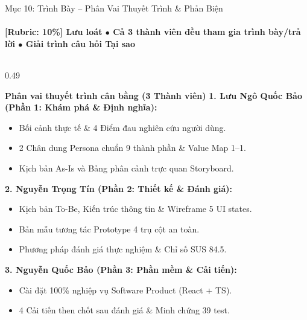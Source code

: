 \begin{frame}{Mục 10: Trình Bày -- Phân Vai Thuyết Trình \& Phản Biện}
  \framesubtitle{\color{PetcareSecondary}\textbf{[Rubric: 10\%] Lưu loát $\bullet$ Cả 3 thành viên đều tham gia trình bày/trả lời $\bullet$ Giải trình câu hỏi Tại sao}}

  \begin{columns}[T]
    \begin{column}{0.49\textwidth}
      \begin{block}{\footnotesize \textbf{Phân vai thuyết trình cân bằng (3 Thành viên)}}
        \tiny
        \textbf{1. Lưu Ngô Quốc Bảo (Phần 1: Khám phá \& Định nghĩa):}
        \begin{itemize}
          \setlength\itemsep{0.3mm}
          \item Bối cảnh thực tế \& 4 Điểm đau nghiên cứu người dùng.
          \item 2 Chân dung Persona chuẩn 9 thành phần \& Value Map 1--1.
          \item Kịch bản As-Is và Bảng phân cảnh trực quan Storyboard.
        \end{itemize}
        \vspace{0.5mm}
        \textbf{2. Nguyễn Trọng Tín (Phần 2: Thiết kế \& Đánh giá):}
        \begin{itemize}
          \setlength\itemsep{0.3mm}
          \item Kịch bản To-Be, Kiến trúc thông tin \& Wireframe 5 UI states.
          \item Bản mẫu tương tác Prototype 4 trụ cột an toàn.
          \item Phương pháp đánh giá thực nghiệm \& Chỉ số SUS 84.5.
        \end{itemize}
        \vspace{0.5mm}
        \textbf{3. Nguyễn Quốc Bảo (Phần 3: Phần mềm \& Cải tiến):}
        \begin{itemize}
          \setlength\itemsep{0.3mm}
          \item Cài đặt 100\% nghiệp vụ Software Product (React + TS).
          \item 4 Cải tiến then chốt sau đánh giá \& Minh chứng 39 test.
        \end{itemize}
      \end{block}
    \end{column}


\end{columns}
\end{frame}
